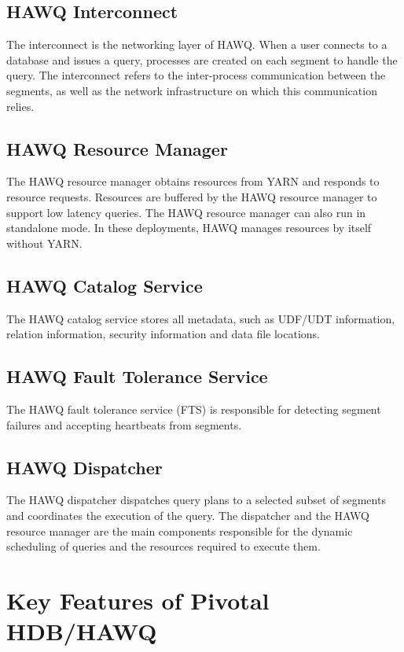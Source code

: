 \documentclass[9pt,twocolumn,twoside]{../../styles/osajnl}
\begin{document}
\subsection{HAWQ Interconnect}

The interconnect is the networking layer of HAWQ. When a user 
connects to a database and issues a query, processes are created on 
each segment to handle the query. The interconnect refers to the 
inter-process communication between the segments, as well as the 
network infrastructure on which this communication relies.

\subsection{HAWQ Resource Manager}

The HAWQ resource manager obtains resources from YARN and responds to 
resource requests. Resources are buffered by the HAWQ resource 
manager to support low latency queries. The HAWQ resource manager can 
also run in standalone mode. In these deployments, HAWQ manages 
resources by itself without YARN.

\subsection{HAWQ Catalog Service}

The HAWQ catalog service stores all metadata, such as 
{UDF/UDT}\cite{www-udt}
information, relation information, security information and data file 
locations.

\subsection{HAWQ Fault Tolerance Service}

The HAWQ fault tolerance service (FTS) is responsible for detecting 
segment failures and accepting heartbeats from segments.

\subsection{HAWQ Dispatcher}

The HAWQ dispatcher dispatches query plans to a selected subset of 
segments and coordinates the execution of the query. The dispatcher 
and the HAWQ resource manager are the main components responsible for 
the dynamic scheduling of queries and the resources required to 
execute them.

\section{Key Features of Pivotal HDB/HAWQ}
\end{document}
